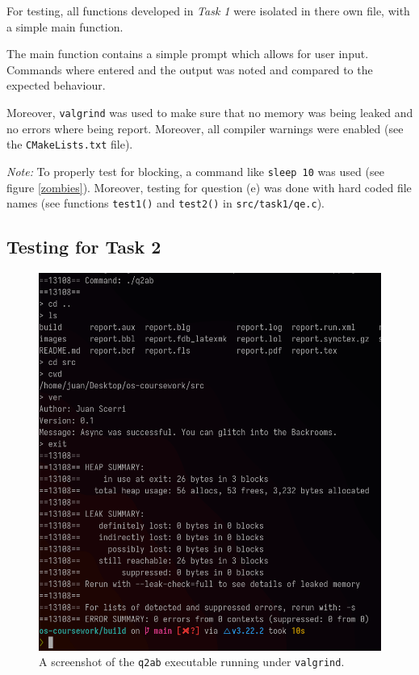 \documentclass[12pt]{article}
\begin{document}
For testing, all functions developed in \textit{Task 1} were
isolated in there own file, with a simple main function.

The main function contains a simple prompt which allows for user
input. Commands where entered and the output was noted and
compared to the expected behaviour.

Moreover, \texttt{valgrind} was used to make sure that no memory
was being leaked and no errors where being report. Moreover, all
compiler warnings were enabled (see the \texttt{CMakeLists.txt}
file).

\textit{Note:} To properly test for blocking, a command like
\texttt{sleep 10} was used (see figure \ref{zombies}). Moreover,
testing for question (e) was done with hard coded file names
(see functions \texttt{test1()} and \texttt{test2()}
in \texttt{src/task1/qe.c}).

\subsection{Testing for Task 2}

\begin{figure}[H]
\centering
\includegraphics[width=12cm]{q2ab-test}
\caption{A screenshot of the \texttt{q2ab} executable running
under \texttt{valgrind}.}
\end{figure}
\end{document}
